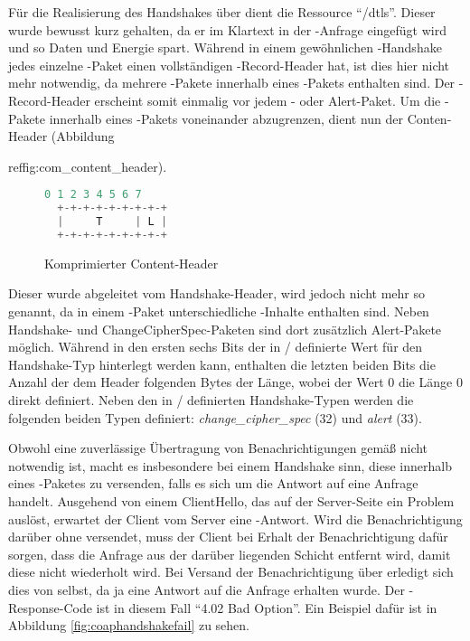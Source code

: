 Für die Realisierung des Handshakes über  dient die Ressource "`/dtls"'. Dieser  wurde bewusst kurz gehalten,
da er im Klartext in der -Anfrage eingefügt wird und so Daten und Energie spart. Während in einem gewöhnlichen -Handshake
jedes einzelne -Paket einen vollständigen -Record-Header hat, ist dies hier nicht mehr notwendig, da mehrere
-Pakete innerhalb eines -Pakets enthalten sind. Der -Record-Header erscheint somit einmalig vor jedem
- oder Alert-Paket. Um die -Pakete innerhalb eines -Pakets voneinander abzugrenzen, dient nun der
Conten-Header (Abbildung {ref{fig:com\_content\_header}).

\begin{figure}[ht]
  \centering
  \begin{lstlisting}[language=c]
   0 1 2 3 4 5 6 7
  +-+-+-+-+-+-+-+-+
  |     T     | L |
  +-+-+-+-+-+-+-+-+
  \end{lstlisting}
  \caption{Komprimierter Content-Header}
  \label{fig:com_content_header}
\end{figure}

Dieser wurde abgeleitet vom Handshake-Header, wird jedoch nicht mehr so genannt, da in einem -Paket unterschiedliche -Inhalte
enthalten sind. Neben Handshake- und ChangeCipherSpec-Paketen sind dort zusätzlich Alert-Pakete möglich. Während in den ersten sechs Bits der in
/ definierte Wert für den Handshake-Typ hinterlegt werden kann, enthalten die letzten beiden Bits die Anzahl der dem Header folgenden
Bytes der Länge, wobei der Wert 0 die Länge 0 direkt definiert. Neben den in / definierten Handshake-Typen werden die folgenden
beiden Typen definiert: \textit{change\_cipher\_spec} (32) und \textit{alert} (33).

Obwohl eine zuverlässige Übertragung von Benachrichtigungen gemäß  nicht notwendig ist, macht es insbesondere bei einem Handshake sinn, diese
innerhalb eines -Paketes zu versenden, falls es sich um die Antwort auf eine Anfrage handelt. Ausgehend von einem ClientHello, das
auf der Server-Seite ein Problem auslöst, erwartet der Client vom Server eine -Antwort. Wird die Benachrichtigung darüber ohne  versendet,
muss der Client bei Erhalt der Benachrichtigung dafür sorgen, dass die Anfrage aus der darüber liegenden  Schicht entfernt wird, damit diese
nicht wiederholt wird. Bei Versand der Benachrichtigung über  erledigt sich dies von selbst, da ja eine Antwort auf die Anfrage erhalten wurde.
Der -Response-Code ist in diesem Fall "`4.02 Bad Option"'. Ein Beispiel dafür ist in Abbildung \ref{fig:coaphandshakefail} zu sehen.

}
